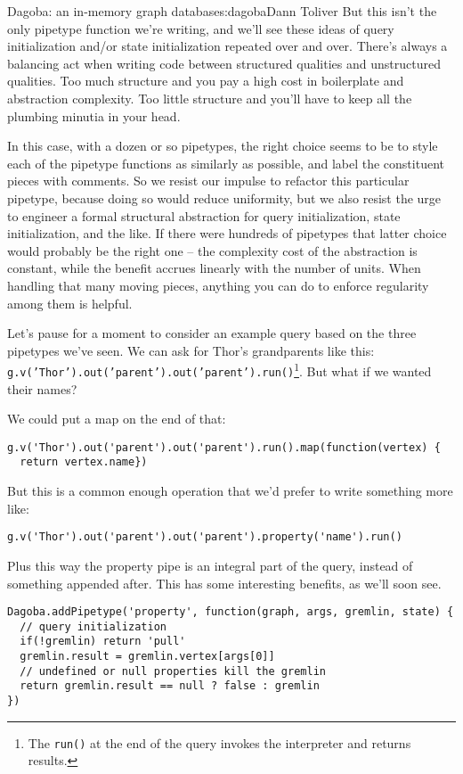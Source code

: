 \begin{aosachapter}{Dagoba: an in-memory graph database}{s:dagoba}{Dann Toliver}
But this isn't the only pipetype function we're writing, and we'll see
these ideas of query initialization and/or state initialization repeated
over and over. There's always a balancing act when writing code between
structured qualities and unstructured qualities. Too much structure and
you pay a high cost in boilerplate and abstraction complexity. Too
little structure and you'll have to keep all the plumbing minutia in
your head.

In this case, with a dozen or so pipetypes, the right choice seems to be
to style each of the pipetype functions as similarly as possible, and
label the constituent pieces with comments. So we resist our impulse to
refactor this particular pipetype, because doing so would reduce
uniformity, but we also resist the urge to engineer a formal structural
abstraction for query initialization, state initialization, and the
like. If there were hundreds of pipetypes that latter choice would
probably be the right one -- the complexity cost of the abstraction is
constant, while the benefit accrues linearly with the number of units.
When handling that many moving pieces, anything you can do to enforce
regularity among them is helpful.

\label{property}

Let's pause for a moment to consider an example query based on the three
pipetypes we've seen. We can ask for Thor's grandparents like this:
\texttt{g.v('Thor').out('parent').out('parent').run()}\footnote{The
  \texttt{run()} at the end of the query invokes the interpreter and
  returns results.}. But what if we wanted their names?

We could put a map on the end of that:

\begin{verbatim}
g.v('Thor').out('parent').out('parent').run().map(function(vertex) {
  return vertex.name})
\end{verbatim}

But this is a common enough operation that we'd prefer to write
something more like:

\begin{verbatim}
g.v('Thor').out('parent').out('parent').property('name').run()
\end{verbatim}

Plus this way the property pipe is an integral part of the query,
instead of something appended after. This has some interesting benefits,
as we'll soon see.

\begin{verbatim}
Dagoba.addPipetype('property', function(graph, args, gremlin, state) {
  // query initialization
  if(!gremlin) return 'pull'                            
  gremlin.result = gremlin.vertex[args[0]]
  // undefined or null properties kill the gremlin
  return gremlin.result == null ? false : gremlin       
})
\end{verbatim}


\end{aosachapter}
